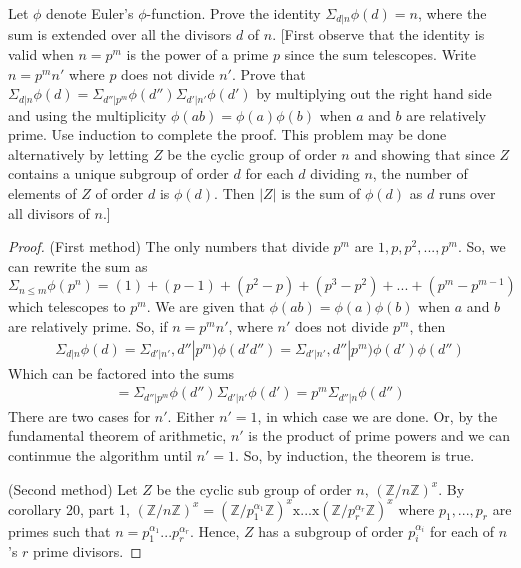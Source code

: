 \documentclass[10pt]{article}
\newenvironment{problem}[2][Problem]{\begin{trivlist}
		\item[\hskip \labelsep {\bfseries #1}\hskip \labelsep {\bfseries #2.}]}{\end{trivlist}}
\begin{document}
	\begin{problem}{5.5}
		Let $\phi$ denote Euler's $\phi$-function. Prove the identity $\Sigma_{d|n} \phi(d) = n$, where the sum is extended over all the divisors $d$ of $n$. [First observe that the identity is valid when $n = p^m$ is the power of a prime $p$ since the sum telescopes. Write $n = p^mn'$ where $p$ does not divide $n'$. Prove that $\Sigma_{d|n} \phi(d) = \Sigma_{d''|p^m} \phi(d'')\Sigma_{d'|n'} \phi(d')$ by multiplying out the right hand side and using the multiplicity $\phi(ab) = \phi(a)\phi(b)$ when $a$ and $b$ are relatively prime. Use induction to complete the proof. This problem may be done alternatively by letting $Z$ be the cyclic group of order $n$ and showing that since $Z$ contains a unique	subgroup of order $d$ for each $d$ dividing $n$, the number of elements of $Z$ of order $d$ is $\phi(d)$. Then $|Z|$ is the sum of $\phi(d)$ as $d$ runs over all divisors of $n$.]
		
		\begin{proof}{(First method)} 
			The only numbers that divide $p^m$ are $1, p, p^2,..., p^m$. So, we can rewrite the sum as $\Sigma_{n \leq m} \phi(p^n) = (1) + (p-1) + (p^2 - p) + (p^3-p^2) + ... + (p^m - p^{m-1})$ which telescopes to $p^m$. We are given that $\phi(ab) = \phi(a)\phi(b)$ when $a$ and $b$ are relatively prime. So, if $n = p^mn'$, where $n'$ does not divide $p^m$, then 
			\begin{align*}
				\Sigma_{d|n} \phi(d) = \Sigma_{d'|n'}, d''|p^m) \phi(d'd'') = \Sigma_{d'|n'}, d''|p^m) \phi(d')\phi(d'')
			\end{align*}		
			Which can be factored into the sums
			\begin{align*}
				= \Sigma_{d''|p^m} \phi(d'')\Sigma_{d'|n'} \phi(d') = p^m\Sigma_{d''|n} \phi(d'')
			\end{align*}
			There are two cases for $n'$. Either $n'=1$, in which case we are done. Or, by the fundamental theorem of arithmetic, $n'$ is the product of prime powers and we can continmue the algorithm until $n'=1$. So, by induction, the theorem is true.
			
			(Second method) Let $Z$ be the cyclic sub group of order $n$, $(\mathbb{Z}/n\mathbb{Z})^x$. By corollary 20, part 1, $(\mathbb{Z}/n\mathbb{Z})^x = (\mathbb{Z}/p_1^{\alpha_1}\mathbb{Z})^x \text{x}...\text{x} (\mathbb{Z}/p_r^{\alpha_r}\mathbb{Z})^x$ where $p_1, ..., p_r$ are primes such that $n = p_1^{\alpha_1} ... p_r^{\alpha_r}$. Hence, $Z$ has a subgroup of order $p_i^{\alpha_i}$ for each of $n$'s $r$ prime divisors.
		\end{proof}
	\end{problem}
	
\end{document}
